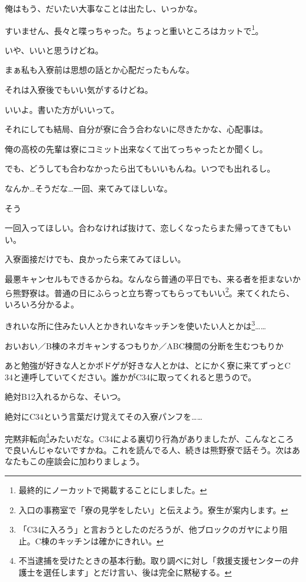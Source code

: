 \begin{multicols}{2}
俺はもう、だいたい大事なことは出たし、いっかな。

すいません、長々と喋っちゃった。ちょっと重いところはカットで\footnote{最終的にノーカットで掲載することにしました。}。

いや、いいと思うけどね。

まぁ私も入寮前は思想の話とか心配だったもんな。

それは入寮後でもいい気がするけどね。

いいよ。書いた方がいいって。

それにしても結局、自分が寮に合う合わないに尽きたかな、心配事は。

俺の高校の先輩は寮にコミット出来なくて出てっちゃったとか聞くし。

でも、どうしても合わなかったら出てもいいもんね。いつでも出れるし。

なんか…そうだな…一回、来てみてほしいな。

そう

一回入ってほしい。合わなければ抜けて、恋しくなったらまた帰ってきてもいい。

入寮面接だけでも、良かったら来てみてほしい。

最悪キャンセルもできるからね。なんなら普通の平日でも、来る者を拒まないから熊野寮は。普通の日にふらっと立ち寄ってもらってもいい\footnote{入口の事務室で「寮の見学をしたい」と伝えよう。寮生が案内します。}。来てくれたら、いろいろ分かるよ。

きれいな所に住みたい人とかきれいなキッチンを使いたい人とかは\footnote{「C34に入ろう」と言おうとしたのだろうが、他ブロックのガヤにより阻止。C棟のキッチンは確かにきれい。}……

\par{}\hspace{2mm} おいおい／B棟のネガキャンするつもりか／ABC棟間の分断を生むつもりか

あと勉強が好きな人とかボドゲが好きな人とかは、とにかく寮に来てずっとC
34と連呼していてください。誰かがC34に取ってくれると思うので。

絶対B12入れるからな、そいつ。

絶対にC34という言葉だけ覚えてその入寮パンフを……

完黙非転向\footnote{不当逮捕を受けたときの基本行動。取り調べに対し「救援支援センターの弁護士を選任します」とだけ言い、後は完全に黙秘する。}みたいだな。C34による裏切り行為がありましたが、こんなところで良いんじゃないですかね。これを読んでる人、続きは熊野寮で話そう。次はあなたもこの座談会に加わりましょう。


\end{multicols}
